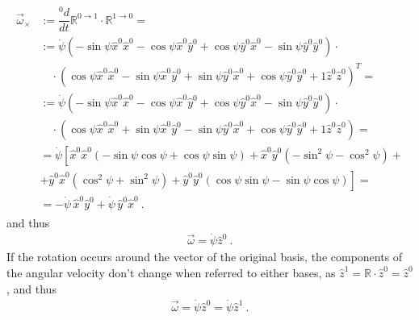 \documentclass[letterpaper,10pt,english]{jupyterBook}
\begin{document}
\begin{equation*}
\begin{split}\begin{aligned}
  \vec{\omega}_\times 
  & := \dfrac{{}^0 d}{dt} \mathbb{R}^{0 \rightarrow 1} \cdot \mathbb{R}^{1 \rightarrow 0} = \\
  & := \dot{\psi} \left( -\sin \psi \hat{x}^0 \hat{x}^0 - \cos \psi \hat{x}^0 \hat{y}^0 + \cos \psi\hat{y}^0 \hat{x}^0 - \sin \psi \hat{y}^0 \hat{y}^0 \right) \cdot \\
  & \quad \cdot \left( \cos \psi \hat{x}^0 \hat{x}^0 - \sin \psi \hat{x}^0 \hat{y}^0 + \sin \psi\hat{y}^0 \hat{x}^0 + \cos \psi \hat{y}^0 \hat{y}^0 + 1 \hat{z}^0 \hat{z}^0  \right)^T =  \\
  & := \dot{\psi} \left( -\sin \psi \hat{x}^0 \hat{x}^0 - \cos \psi \hat{x}^0 \hat{y}^0 + \cos \psi\hat{y}^0 \hat{x}^0 - \sin \psi \hat{y}^0 \hat{y}^0 \right) \cdot \\
  & \quad \cdot \left( \cos \psi \hat{x}^0 \hat{x}^0 + \sin \psi \hat{x}^0 \hat{y}^0 - \sin \psi\hat{y}^0 \hat{x}^0 + \cos \psi \hat{y}^0 \hat{y}^0 + 1 \hat{z}^0 \hat{z}^0  \right) =  \\
  & = \dot{\psi} \left[ \hat{x}^0 \hat{x}^0 \left( - \sin \psi \cos \psi + \cos \psi \sin \psi \right) + 
                        \hat{x}^0 \hat{y}^0 \left( - \sin^2 \psi - \cos^2 \psi  \right) \right. + \\ 
  & + \left.            \hat{y}^0 \hat{x}^0 \left(   \cos^2 \psi + \sin^2 \psi  \right) + 
                        \hat{y}^0 \hat{y}^0 \left( \cos \psi \sin \psi - \sin \psi \cos \psi \right) \right] = \\
  & = - \dot{\psi} \, \hat{x}^0 \hat{y}^0 + \dot{\psi} \, \hat{y}^0 \hat{x}^0  \ .
\end{aligned}\end{split}
\end{equation*}
\sphinxAtStartPar
and thus
\begin{equation*}
\begin{split}\vec{\omega} = \dot{\psi} \hat{z}^0 \ .\end{split}
\end{equation*}
\sphinxAtStartPar
If the rotation occurs around the vector of the original basis, the components of the angular velocity don’t change when referred to either bases, as \(\hat{z}^1 = \mathbb{R} \cdot \hat{z}^0 = \hat{z}^0\), and thus
\begin{equation*}
\begin{split}\vec{\omega} = \dot{\psi} \hat{z}^0 = \dot{\psi} \hat{z}^1 \ .\end{split}
\end{equation*}
\sphinxAtStartPar
{}
\end{document}
